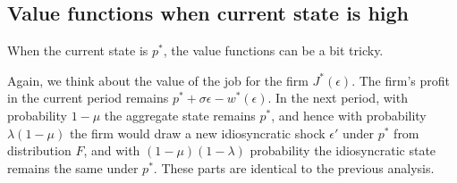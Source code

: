 \documentclass[12pt]{article}
\begin{document}
\subsection{Value functions when current state is high}

When the current state is $p^*$, the value functions can be a bit tricky. 

Again, we think about the value of the job for the firm $J^*(\epsilon)$. The firm's profit in the current period remains $p^* + \sigma \epsilon - w^*(\epsilon)$. In the next period, with probability $1-\mu$ the aggregate state remains $p^*$, and hence with probability $\lambda(1-\mu)$ the firm would draw a new idiosyncratic shock $\epsilon'$ under $p^*$ from distribution $F$, and with $(1-\mu) (1-\lambda)$ probability the idiosyncratic state remains the same under $p^*$. These parts are identical to the previous analysis.
\end{document}
